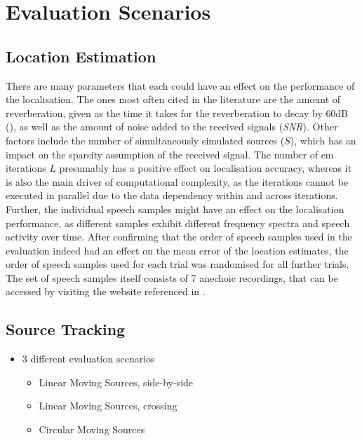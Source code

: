 \section{Evaluation Scenarios}
\subsection{Location Estimation}
There are many parameters that each could have an effect on the performance of the localisation. The ones most often cited in the literature are the amount of reverberation, given as the time it takes for the reverberation to decay by 60dB (\Tsixty), as well as the amount of noise added to the received signals (\emph{SNR}). Other factors include the number of simultaneously simulated sources ($S$), which has an impact on the sparsity assumption of the received signal. The number of \gls{em} iterations $L$ presumably has a positive effect on localisation accuracy, whereas it is also the main driver of computational complexity, as the iterations cannot be executed in parallel due to the data dependency within and across iterations. Further, the individual speech samples might have an effect on the localisation performance, as different samples exhibit different frequency spectra and speech activity over time. After confirming that the order of speech samples used in the evaluation indeed had an effect on the mean error of the location estimates, the order of speech samples used for each trial was randomised for all further trials. The set of speech samples itself consists of 7 anechoic recordings, that can be accessed by visiting the website referenced in \cite{Mainczyk2017}.


\subsection{Source Tracking}
\begin{itemize}
    \item 3 different evaluation scenarios
    \begin{itemize}
        \item Linear Moving Sources, side-by-side
        \item Linear Moving Sources, crossing
        \item Circular Moving Sources
    \end{itemize}
\end{itemize}
